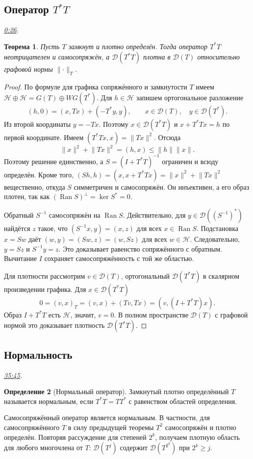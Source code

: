 \documentclass[11pt,a4paper]{article}
\theoremstyle{plain}
\newtheorem{theorem}{Теорема}[section]
\theoremstyle{definition}
\newtheorem{definition}[theorem]{Определение}
\newcommand{\Hh}{\mathcal H}
\newcommand{\Dom}{\mathcal D}
\newcommand{\id}{I}
\newcommand{\norm}[1]{\lVert#1\rVert}
\DeclareMathOperator{\Ran}{Ran}
\newcommand{\at}[3]{\href{https://www.youtube.com/watch?v=#1&t=#2s}{#3}}
\newcommand{\topic}[2]{\Needspace{5\baselineskip}\subsection*{#1}\noindent\emph{#2.}\par\nobreak\smallskip}
\begin{document}
\topic{Оператор $T^*T$}{\at{gTOamZ5pJdY}{26}{0:26}}
\begin{theorem}
Пусть $T$ замкнут и плотно определён. Тогда оператор
$T^*T$ неотрицателен и самосопряжён, а
$\Dom(T^*T)$ плотна в $\Dom(T)$ относительно
графовой нормы $\norm{\cdot}_T$.
\end{theorem}
\begin{proof}
По формуле для графика сопряжённого и замкнутости $T$
имеем $\Hh\oplus\Hh=G(T)\oplus WG(T^*)$.
Для $h\in\Hh$ запишем ортогональное разложение
\[
 (h,0)=(x,Tx)+(-T^*y,y),
 \qquad x\in\Dom(T),\quad y\in\Dom(T^*).
\]
Из второй координаты $y=-Tx$. Поэтому
$x\in\Dom(T^*T)$ и $x+T^*Tx=h$ по первой координате.
Имеем $(T^*Tx,x)=\norm{Tx}^2$. Отсюда
\[
 \norm{x}^2+\norm{Tx}^2=(h,x)\le\norm h\norm x .
\]
Поэтому решение единственно, а
$S=(\id+T^*T)^{-1}$ ограничен и всюду определён.
Кроме того, $(Sh,h)=(x,x+T^*Tx)=\norm x^2+\norm{Tx}^2$
вещественно, откуда $S$ симметричен и самосопряжён.
Он инъективен, а его образ плотен, так как
$(\Ran S)^\perp=\ker S^*=0$.

Обратный $S^{-1}$ самосопряжён на $\Ran S$.
Действительно, для $y\in\Dom((S^{-1})^*)$ найдётся
$z$ такое, что $(S^{-1}x,y)=(x,z)$ для всех
$x\in\Ran S$. Подстановка $x=Sw$ даёт
$(w,y)=(Sw,z)=(w,Sz)$ для всех $w\in\Hh$.
Следовательно, $y=Sz$ и $S^{-1}y=z$. Это доказывает
равенство сопряжённого с обратным. Вычитание $\id$
сохраняет самосопряжённость с той же областью.

Для плотности рассмотрим $v\in\Dom(T)$, ортогональный
$\Dom(T^*T)$ в скалярном произведении графика. Для
$x\in\Dom(T^*T)$
\[
 0=(v,x)_T=(v,x)+(Tv,Tx)=(v,(\id+T^*T)x).
\]
Образ $\id+T^*T$ есть $\Hh$, значит, $v=0$.
В полном пространстве $\Dom(T)$ с графовой нормой
это доказывает плотность $\Dom(T^*T)$.
\end{proof}

\topic{Нормальность}{\at{gTOamZ5pJdY}{2145}{35:45}}
\begin{definition}[Нормальный оператор]
Замкнутый плотно определённый $T$ называется нормальным,
если $T^*T=TT^*$ с равенством областей определения.
\end{definition}
Самосопряжённый оператор является нормальным.
В частности, для самосопряжённого $T$ в силу
предыдущей теоремы $T^2$ самосопряжён и плотно
определён. Повторяя рассуждение для степеней $2^k$,
получаем плотную область для любого многочлена от $T$:
$\Dom(T^j)$ содержит $\Dom(T^{2^k})$ при $2^k\ge j$.
\end{document}
